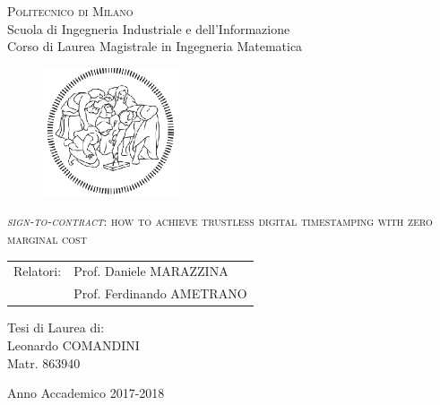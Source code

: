 \begin{titlepage}

	\begin{center}
		\normalsize 
			\textsc{Politecnico di Milano}\\
			Scuola di Ingegneria Industriale e dell'Informazione\\
      		Corso di Laurea Magistrale in Ingegneria Matematica\\
	\end{center}
	\vspace{.6cm}
	
	\begin{figure}[htpb]
		\centering
		\includegraphics[width=4cm]{Cover/polimi}
	\end{figure}
	\vspace{.6cm}
	
	\begin{center}
		\LARGE
			\textsc{\textit{sign-to-contract}: how to achieve trustless digital timestamping with zero marginal cost}
	\end{center}
	\vspace{1.6cm}

	\begin{flushleft}
		\large
		\begin{tabular}{ll}
		Relatori:    & Prof. Daniele MARAZZINA      \\
		             & Prof. Ferdinando AMETRANO
		\end{tabular}
		\vspace{1cm}
	\end{flushleft}
	
	\begin{flushright}
		\large
		Tesi di Laurea di:\\
		Leonardo COMANDINI\\
		Matr. 863940\\		
	\end{flushright}
	
	\vspace*{\fill}
	\begin{center}
		Anno Accademico 2017-2018
	\end{center}
	
\end{titlepage}
